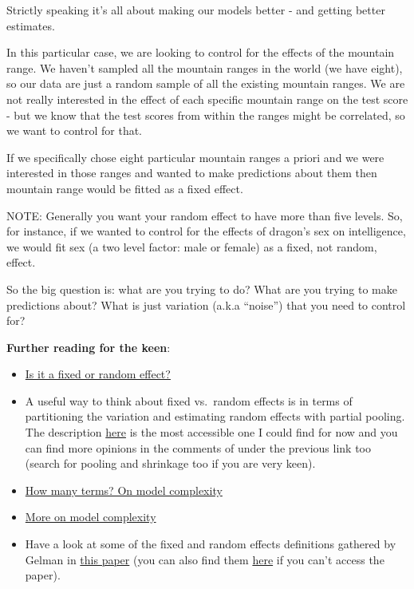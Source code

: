 \documentclass[
  letterpaper,
  DIV=11,
  numbers=noendperiod]{scrreprt}
\providecommand{\tightlist}{%
  \setlength{\itemsep}{0pt}\setlength{\parskip}{0pt}}\usepackage{longtable,booktabs,array}
\begin{document}
Strictly speaking it's all about making our models better - and getting
better estimates.

In this particular case, we are looking to control for the effects of
the mountain range. We haven't sampled all the mountain ranges in the
world (we have eight), so our data are just a random sample of all the
existing mountain ranges. We are not really interested in the effect of
each specific mountain range on the test score - but we know that the
test scores from within the ranges might be correlated, so we want to
control for that.

If we specifically chose eight particular mountain ranges a priori and
we were interested in those ranges and wanted to make predictions about
them then mountain range would be fitted as a fixed effect.

NOTE: Generally you want your random effect to have more than five
levels. So, for instance, if we wanted to control for the effects of
dragon's sex on intelligence, we would fit sex (a two level factor: male
or female) as a fixed, not random, effect.

So the big question is: what are you trying to do? What are you trying
to make predictions about? What is just variation (a.k.a ``noise'') that
you need to control for?

\textbf{Further reading for the keen}:

\begin{itemize}
\tightlist
\item
  \href{https://dynamicecology.wordpress.com/2015/11/04/is-it-a-fixed-or-random-effect/}{Is
  it a fixed or random effect?}
\item
  A useful way to think about fixed vs.~random effects is in terms of
  partitioning the variation and estimating random effects with partial
  pooling. The description
  \href{https://stats.stackexchange.com/questions/4700/what-is-the-difference-between-fixed-effect-random-effect-in-mixed-effect-model}{here}
  is the most accessible one I could find for now and you can find more
  opinions in the comments of under the previous link too (search for
  pooling and shrinkage too if you are very keen).
\item
  \href{https://dynamicecology.wordpress.com/2015/02/05/how-many-terms-in-your-model-before-statistical-machismo/}{How
  many terms? On model complexity}
\item
  \href{https://dynamicecology.wordpress.com/2014/12/02/why-are-your-statistical-models-more-complex-these-days/}{More
  on model complexity}
\item
  Have a look at some of the fixed and random effects definitions
  gathered by Gelman in
  \href{http://www.stat.columbia.edu/~gelman/research/published/AOS259.pdf}{this
  paper} (you can also find them
  \href{http://stats.stackexchange.com/questions/4700/what-is-the-difference-between-fixed-effect-random-effect-and-mixed-effect-mode/4702\#4702}{here}
  if you can't access the paper).
\end{itemize}
\end{document}
